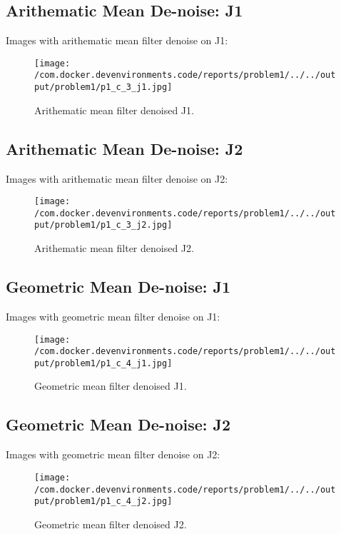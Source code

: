 \documentclass{article}%
\begin{document}
%
\newpage%
\subsection{Arithematic Mean De{-}noise: J1}%
\label{subsec:ArithematicMeanDe{-}noiseJ1}%
Images with arithematic mean filter denoise on J1:%


\begin{figure}[h!]%
\centering%
\texttt{[image: /com.docker.devenvironments.code/reports/problem1/../../output/problem1/p1\_c\_3\_j1.jpg]}%
\caption{Arithematic mean filter denoised J1.}%
\end{figure}

%
\subsection{Arithematic Mean De{-}noise: J2}%
\label{subsec:ArithematicMeanDe{-}noiseJ2}%
Images with arithematic mean filter denoise on J2:%


\begin{figure}[h!]%
\centering%
\texttt{[image: /com.docker.devenvironments.code/reports/problem1/../../output/problem1/p1\_c\_3\_j2.jpg]}%
\caption{Arithematic mean filter denoised J2.}%
\end{figure}

%
\subsection{Geometric Mean De{-}noise: J1}%
\label{subsec:GeometricMeanDe{-}noiseJ1}%
Images with geometric mean filter denoise on J1:%


\begin{figure}[h!]%
\centering%
\texttt{[image: /com.docker.devenvironments.code/reports/problem1/../../output/problem1/p1\_c\_4\_j1.jpg]}%
\caption{Geometric mean filter denoised J1.}%
\end{figure}

%
\subsection{Geometric Mean De{-}noise: J2}%
\label{subsec:GeometricMeanDe{-}noiseJ2}%
Images with geometric mean filter denoise on J2:%


\begin{figure}[h!]%
\centering%
\texttt{[image: /com.docker.devenvironments.code/reports/problem1/../../output/problem1/p1\_c\_4\_j2.jpg]}%
\caption{Geometric mean filter denoised J2.}%
\end{figure}
\end{document}
